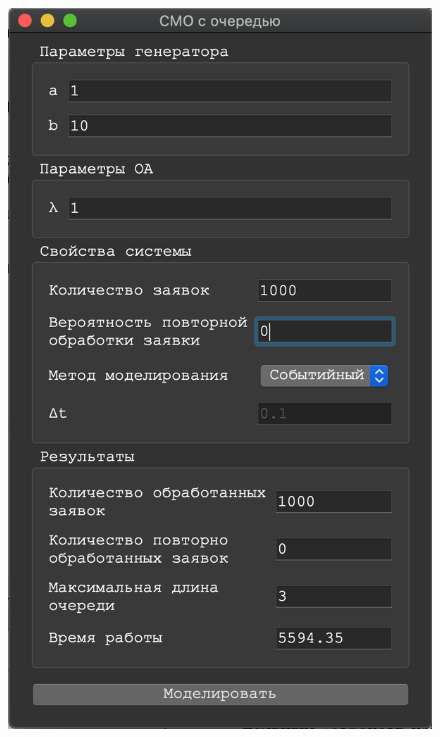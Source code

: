 \documentclass[a4paper,12pt]{article}
\begin{document}
\begin{figure}[h!]
\begin{minipage}[b]{0.32\textwidth}
			\includegraphics[width=\textwidth]{sob_1_2.png}
		\end{minipage}
		\begin{minipage}[b]{0.32\textwidth}

\end{minipage}
\end{figure}
\end{document}
